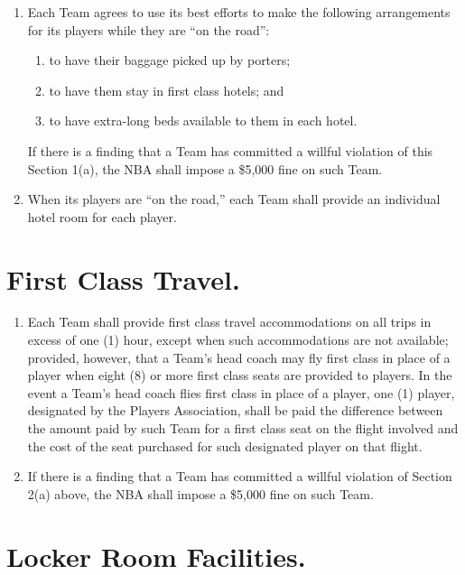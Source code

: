 \documentclass[
]{book}
\providecommand{\tightlist}{%
  \setlength{\itemsep}{0pt}\setlength{\parskip}{0pt}}
\begin{document}
\begin{enumerate}
\def\labelenumi{(\alph{enumi})}
\tightlist
\item
  Each Team agrees to use its best efforts to make the following arrangements for its players while they are ``on the road'':

  \begin{enumerate}
  \def\labelenumii{(\roman{enumii})}
  \tightlist
  \item
    to have their baggage picked up by porters;
  \item
    to have them stay in first class hotels; and
  \item
    to have extra-long beds available to them in each hotel.
  \end{enumerate}

  If there is a finding that a Team has committed a willful violation of this Section 1(a), the NBA shall impose a \$5,000 fine on such Team.
\item
  When its players are ``on the road,'' each Team shall provide an individual hotel room for each player.
\end{enumerate}

\hypertarget{first-class-travel.}{%
\section{First Class Travel.}\label{first-class-travel.}}

\begin{enumerate}
\def\labelenumi{(\alph{enumi})}
\tightlist
\item
  Each Team shall provide first class travel accommodations on all trips in excess of one (1) hour, except when such accommodations are not available; provided, however, that a Team's head coach may fly first class in place of a player when eight (8) or more first class seats are provided to players. In the event a Team's head coach flies first class in place of a player, one (1) player, designated by the Players Association, shall be paid the difference between the amount paid by such Team for a first class seat on the flight involved and the cost of the seat purchased for such designated player on that flight.
\item
  If there is a finding that a Team has committed a willful violation of Section 2(a) above, the NBA shall impose a \$5,000 fine on such Team.
\end{enumerate}

\hypertarget{locker-room-facilities.}{%
\section{Locker Room Facilities.}\label{locker-room-facilities.}}
\end{document}
